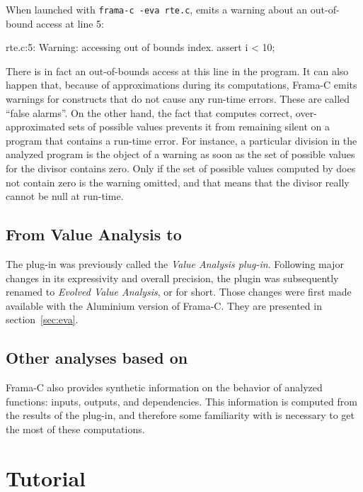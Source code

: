 \documentclass{frama-c-book}
\begin{document}

When launched with \lstinline|frama-c -eva rte.c|,
\Eva{} emits a warning about an out-of-bound access at line 5:
\begin{logsmath}
 rte.c:5: Warning: accessing out of bounds index. assert i < 10;
\end{logsmath}
There is in fact an out-of-bounds access at this line in the program.
It can also happen that, because of approximations during its computations,
Frama-C emits warnings for constructs
that do not cause any run-time errors. These are called ``false alarms''.
On the other hand, the fact that \Eva{}
computes correct, over-approximated sets of possible values prevents it
from remaining silent on a program that contains a run-time error. For
instance, a particular division in the analyzed program
is the object of a warning
as soon as the set of possible values for the divisor
contains zero. Only
if the set of possible values computed by \Eva{}
does not contain zero is the warning omitted, and
that means that the divisor really cannot be null at run-time.

\section{From Value Analysis to \Eva{}}

The \Eva{} plug-in was previously called the \emph{Value Analysis plug-in}.
Following major changes in its expressivity and overall precision,
the plugin was subsequently renamed to \emph{Evolved Value Analysis}, or
\Eva{} for short. Those changes were first made available with the
Aluminium version of Frama-C. They are presented in section~\ref{sec:eva}.

\section{Other analyses based on \Eva{}}

Frama-C also provides
synthetic information on the behavior of analyzed functions:
inputs, outputs, and dependencies. This information is computed
from the results of the \Eva{} plug-in,
and therefore some familiarity with \Eva{}
is necessary to get the most of these computations.

\chapter{Tutorial}\label{tutorial}
\vspace{2cm}
\end{document}
